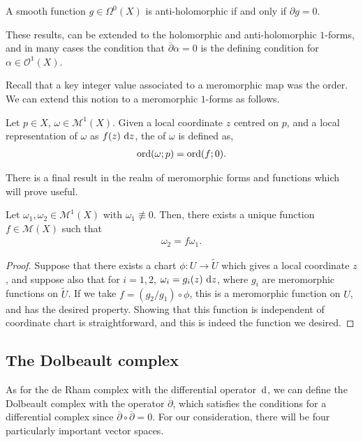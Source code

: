 \begin{proposition}\label{prop:anti-hol}
	A smooth function $ g \in \Omega^0(X) $ is anti-holomorphic if and only if $
		\partial g=0 $.
\end{proposition}

These results, can be extended to the holomorphic and anti-holomorphic $ 1
$-forms, and in many cases the condition
that $ \overline{\partial }\alpha=0 $ is the defining condition for $ \alpha \in
	\mathcal{O}^{1}(X) $.

Recall that a key integer value associated to a meromorphic map was the order.
We can extend this notion to a meromorphic $ 1 $-forms as follows.

\begin{definition}[Order]
	Let $ p \in X $, $ \omega \in \mathcal{M}^{1}(X) $. Given a local coordinate
	$ z $ centred on $ p $, and a local representation of $ \omega $ as $ f ( z
		)\operatorname{\, d\!}{z} $, the  of $ \omega $ is defined as,
	\begin{align*}
		\operatorname{ord} ( \omega;p ) = \operatorname{ord} ( f;0 ).
	\end{align*}
\end{definition}

There is a final result in the
realm of meromorphic forms and functions which will prove useful.

\begin{lemma}\label{lem:mero-1-forms}
	Let $ \omega_{1}, \omega_{2}\in \mathcal{M}^{1}( X ) $ with $ \omega_{1}
		\not\equiv 0 $. Then, there exists a unique function $ f \in \mathcal{M}( X )
	$ such that
	\begin{align*}
		\omega_{2} = f \omega_{1}.
	\end{align*}
	\begin{proof}
		Suppose that there exists a chart $ \phi:U \to \tilde{U} $ which gives a
		local coordinate $ z $, and suppose also that for $ i=1,2 $, $ \omega_{i} =
			g_{i}(z)\operatorname{\, d\!}{z} $, where $ g_{i} $ are meromorphic functions on $ \tilde{U} $.
		If we take $ f = ( g_{2}/g_{1} )\circ \phi $, this is a meromorphic function
		on $ U $, and has the desired property. Showing that this function is
		independent of coordinate chart is straightforward, and this is indeed the
		function we desired.
	\end{proof}
\end{lemma}

\subsection{The Dolbeault complex}
As for the de Rham complex with the differential operator $ \operatorname{\, d\!}{} $, we can
define the Dolbeault complex with the operator $ \overline{\partial} $, which
satisfies the conditions for a differential complex since $
	\overline{\partial}\circ\overline{\partial}=0 $. For our consideration, there
will be four particularly important vector spaces.


